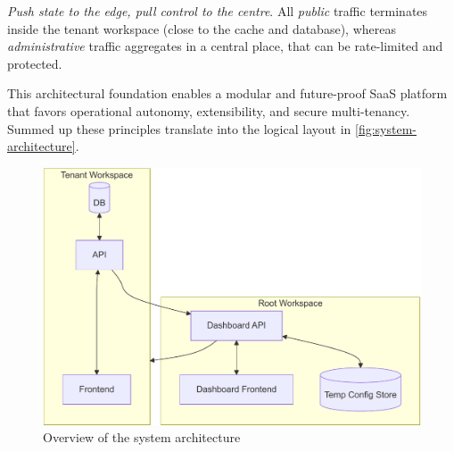 \documentclass[11pt, a4paper, oneside, listof=totoc]{scrartcl}
\begin{document}
\begin{enumerate}[label={[\arabic*]:},
                    ref=Challenge~\arabic*,
                    leftmargin=*,
                    itemsep=0.6\baselineskip]
                    \item\label{chal:pushState}
                        \textit{Push state to the edge, pull control to the centre}.
                        All \textit{public} traffic terminates inside the tenant workspace
                        (close to the cache and database), whereas \textit{administrative} traffic
                        aggregates in a central place, that can be rate-limited and protected.

                \end{enumerate}

                This architectural foundation enables a modular and future-proof SaaS platform that
                favors operational autonomy, extensibility, and secure multi-tenancy.
                \\
                Summed up these principles translate into the logical layout in
                \autoref{fig:system-architecture}.
                \vspace{0.5cm}
                \begin{figure}[H]
                    \centering
                    \includegraphics[scale=0.75]{images/WorkspaceArchitectureCropped.pdf}
                    \caption{Overview of the system architecture}\label{fig:system-architecture}
                \end{figure}
\end{document}
